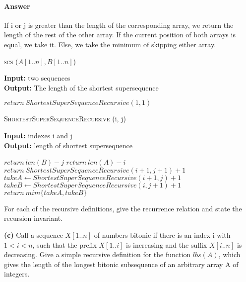 \documentclass{article}
\begin{document}
\paragraph{Answer}

If i or j is greater than the length of the corresponding array, we return the
length of the rest of the other array. If the current position of both arrays is
equal, we take it. Else, we take the minimum of skipping either array.

\begin{algorithm} \caption{\textsc{scs} ($A[1..n], B[1..n]$)}\label{alg:seb}
    {\bf Input:} two sequences\\
    {\bf Output:} The length of the shortest supersequence
    \begin{algorithmic}[1]
        \State$return\ ShortestSuperSequenceRecursive(1, 1)$
    \end{algorithmic}
\end{algorithm}

\begin{algorithm} \caption{\textsc{ShortestSuperSequenceRecursive} (i, j)}\label{alg:seb}
    {\bf Input:} indexes i and j\\
    {\bf Output:} length of shortest supersequence
    \begin{algorithmic}[1]
            \State$return\ len(B) - j$
            \State$return\ len(A) - i$
            \State$return\ ShortestSuperSequenceRecursive(i+1, j+1) +1$
        \EndIf{}
        \State$takeA \gets ShortestSuperSequenceRecursive(i+1, j) +1$
        \State$takeB \gets ShortestSuperSequenceRecursive(i, j+1) +1$
        \State$return\ mim\{takeA, takeB\}$
    \end{algorithmic}
\end{algorithm}

\todo{}



For each of the recursive definitions, give the recurrence
relation and state the recursion invariant.

{\bf (c)} Call a sequence $X[1.. n]$ of numbers bitonic if there is an index i with
$1 < i < n$, such that the prefix $X[1.. i]$ is increasing and the suffix
$X[i .. n]$ is decreasing. Give a simple recursive definition for the function
$lbs(A)$, which gives the length of the longest bitonic subsequence of an
arbitrary array A of integers.
\end{document}
